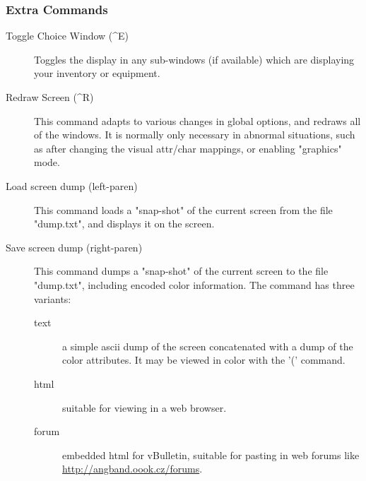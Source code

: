\subsubsection{Extra Commands} 
\begin{description}
\item[Toggle Choice Window (\^{}E)]
  Toggles the display in any sub-windows (if available) which are
  displaying your inventory or equipment.

\item[Redraw Screen (\^{}R)]
  This command adapts to various changes in global options, and redraws
  all of the windows. It is normally only necessary in abnormal
  situations, such as after changing the visual attr/char mappings, or
  enabling "graphics" mode.

\item[Load screen dump (left-paren)]
  This command loads a "snap-shot" of the current screen from the file
  "dump.txt", and displays it on the screen.
  
\item[Save screen dump (right-paren)]
  This command dumps a "snap-shot" of the current screen to the file
  "dump.txt", including encoded color information. The command has three
  variants:
  \begin{description}
  \item[text] a simple ascii dump of the screen concatenated with a
    dump of the color attributes. It may be viewed in color with the '('
    command.
  \item[html] suitable for viewing in a web browser.
  \item[forum] embedded html for vBulletin, suitable for pasting in web
    forums like \url{http://angband.oook.cz/forums}.
  \end{description}
\end{description}
